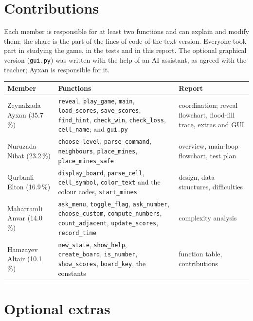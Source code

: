\documentclass[11pt,a4paper]{article}
\newcommand{\code}[1]{\texttt{#1}}
\begin{document}

\section{Contributions}

Each member is responsible for at least two functions and can explain and modify them; the share
is the part of the lines of code of the text version. Everyone took part in studying the game, in the
tests and in this report. The optional graphical version (\code{gui.py}) was written with the help of an
AI assistant, as agreed with the teacher; Ayxan is responsible for it.

\begin{center}
\small
\begin{tabularx}{\linewidth}{l X X}
\toprule
\textbf{Member} & \textbf{Functions} & \textbf{Report}\\
\midrule
Zeynalzada Ayxan (35.7\,\%) & \code{reveal}, \code{play\_game}, \code{main}, \code{load\_scores},
  \code{save\_scores}, \code{find\_hint}, \code{check\_win}, \code{check\_loss}, \code{cell\_name};
  and \code{gui.py} & coordination; reveal flowchart, flood-fill trace, extras and GUI\\
Nuruzada Nihat (23.2\,\%) & \code{choose\_level}, \code{parse\_command}, \code{neighbours},
  \code{place\_mines}, \code{place\_mines\_safe} & overview, main-loop flowchart, test plan\\
Qurbanli Elton (16.9\,\%) & \code{display\_board}, \code{parse\_cell}, \code{cell\_symbol},
  \code{color\_text} and the colour codes, \code{start\_mines} & design, data structures, difficulties\\
Maharramli Anvar (14.0\,\%) & \code{ask\_menu}, \code{toggle\_flag}, \code{ask\_number}, \code{choose\_custom},
  \code{compute\_numbers}, \code{count\_adjacent}, \code{update\_scores}, \code{record\_time} & complexity analysis\\
Hamzayev Altair (10.1\,\%) & \code{new\_state}, \code{show\_help}, \code{create\_board}, \code{is\_number},
  \code{show\_scores}, \code{board\_key}, the constants & function table, contributions\\
\bottomrule
\end{tabularx}
\end{center}

\section{Optional extras}\label{sec:extras}
\end{document}
